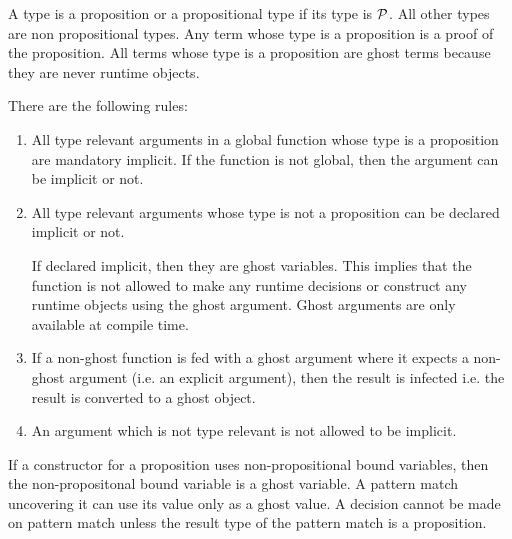 A type is a proposition or a propositional type if its type is ${\mathcal P}$. All
other types are non propositional types. Any term whose type is a proposition is
a proof of the proposition. All terms whose type is a proposition are ghost
terms because they are never runtime objects.


There are the following rules:

\begin{enumerate}
    \item All type relevant arguments in a global function whose type is a
        proposition are mandatory implicit. If the function is not global, then
        the argument can be implicit or not.

    \item All type relevant arguments whose type is not a
        proposition can be declared implicit or not.

        If declared implicit, then they are ghost variables. This implies that
        the function is not allowed to make any runtime decisions or construct
        any runtime objects using the ghost argument. Ghost arguments are only
        available at compile time.

    \item If a non-ghost function is fed with a ghost argument where it expects
        a non-ghost argument (i.e. an explicit argument), then the result is
        infected i.e. the result is converted to a ghost object.

    \item An argument which is not type relevant is not allowed to be implicit.
\end{enumerate}


If a constructor for a proposition uses non-propositional bound variables, then the
non-propositonal bound variable is a ghost variable. A pattern match uncovering
it can use its value only as a ghost value. A decision cannot be made on pattern
match unless the result type of the pattern match is a proposition.
